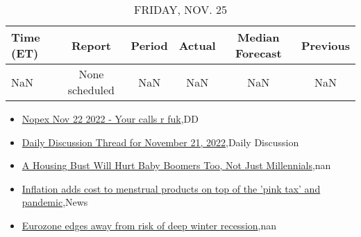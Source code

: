\documentclass{article}%
\begin{document}
%


\begin{table}[htbp]%
\caption{FRIDAY, NOV. 25}%
\centering%
\begin{adjustbox}{width=1\textwidth}%
\begin{tabular}{lccccc}
\toprule
Time (ET) &         Report & Period & Actual & Median Forecast & Previous \\
\midrule
      NaN & None scheduled &    NaN &    NaN &             NaN &      NaN \\
\bottomrule
\end{tabular}
%
\end{adjustbox}%
\end{table}

%
\begin{itemize}%
\item%
\href{https://reddit.com/r/wallstreetbets/comments/z0wpbw/nopex\_nov\_22\_2022\_your\_calls\_r\_fuk/}{Nopex Nov 22 2022 - Your calls r fuk},DD%
\item%
\href{https://reddit.com/r/wallstreetbets/comments/z0w55k/daily\_discussion\_thread\_for\_november\_21\_2022/}{Daily Discussion Thread for November 21, 2022},Daily Discussion%
\item%
\href{https://reddit.com/r/Economics/comments/z0sw81/a\_housing\_bust\_will\_hurt\_baby\_boomers\_too\_not/}{A Housing Bust Will Hurt Baby Boomers Too, Not Just Millennials},nan%
\item%
\href{https://reddit.com/r/Economics/comments/z0pz1t/inflation\_adds\_cost\_to\_menstrual\_products\_on\_top/}{Inflation adds cost to menstrual products on top of the 'pink tax' and pandemic},News%
\item%
\href{https://reddit.com/r/Economics/comments/z0i1fl/eurozone\_edges\_away\_from\_risk\_of\_deep\_winter/}{Eurozone edges away from risk of deep winter recession},nan%
\end{itemize}%
\end{document}
